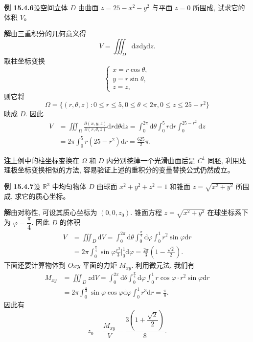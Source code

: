 \documentclass[UTF8, 12pt, fontset=fandol, oneside]{ctexart}
\begin{document}
\noindent\textbf{例 15.4.6}\quad 设空间立体 $D$ 由曲面 $z=25-x^2-y^2$ 与平面 $z=0$ 所围成, 试求它的体积 $V$。

\noindent\textbf{解}\quad 由三重积分的几何意义得
\[
  V=\iiint_D\mathrm dx\mathrm dy\mathrm dz.
\]
取柱坐标变换
\[
  \begin{cases}
    x=r\cos\theta,\\
    y=r\sin\theta,\\
    z=z,
  \end{cases}
\]
则它将
\[
  \Omega=\{(r,\theta,z):0\leqslant r\leqslant5,0\leqslant\theta<2\pi,0\leqslant z\leqslant25-r^2\}
\]
映成 $D$. 因此
\[
\begin{aligned}
  V&=\iiint_\Omega\frac{\partial(x,y,z)}{\partial(r,\theta,z)}
  \mathrm dr\mathrm d\theta\mathrm dz
  =\int_0^{2\pi}\mathrm d\theta\int_0^5 r\mathrm dr\int_0^{25-r^2}\mathrm dz\\
  &=2\pi\int_0^5 r(25-r^2)\mathrm dr=\frac{625}2\pi.
\end{aligned}
\]

\noindent\textbf{注}\quad 上例中的柱坐标变换在 $\Omega$ 和 $D$ 内分别挖掉一个光滑曲面后是 $C^1$ 同胚, 利用处理极坐标变换相似的方法, 容易验证上述的重积分的变量替换公式仍然成立。

\noindent\textbf{例 15.4.7}\quad 设 $\mathbb R^3$ 中均匀物体 $D$ 由球面 $x^2+y^2+z^2=1$ 和锥面 $z=\sqrt{x^2+y^2}$ 所围成, 求它的质心坐标。

\noindent\textbf{解}\quad 由对称性, 可设其质心坐标为 $(0,0,z_0)$. 锥面方程 $z=\sqrt{x^2+y^2}$ 在球坐标系下为 $\varphi=\dfrac\pi4$. 因此 $D$ 的体积
\[
\begin{aligned}
  V&=\iiint_D\mathrm dV
  =\int_0^{2\pi}\mathrm d\theta\int_0^{\frac\pi4}\mathrm d\varphi\int_0^1 r^2\sin\varphi\mathrm dr\\
  &=2\pi\int_0^{\frac\pi4}\sin\varphi\frac{r^3}3\Big|_0^1\mathrm d\varphi
  =\frac{2\pi}3\left(1-\frac{\sqrt2}2\right).
\end{aligned}
\]
下面还要计算物体到 $Oxy$ 平面的力矩 $M_{xy}$. 利用微元法, 我们有
\[
\begin{aligned}
  M_{xy}&=\iiint_D z\mathrm dV
  =\int_0^{2\pi}\mathrm d\theta\int_0^{\frac\pi4}\mathrm d\varphi\int_0^1
  r\cos\varphi\cdot r^2\sin\varphi\mathrm dr\\
  &=2\pi\int_0^{\frac\pi4}\sin\varphi\cos\varphi\mathrm d\varphi\int_0^1r^3\mathrm dr
  =\frac\pi8.
\end{aligned}
\]
因此有
\[
  z_0=\frac{M_{xy}}V=\frac{3\left(1+\dfrac{\sqrt2}2\right)}8.
\]
\end{document}
